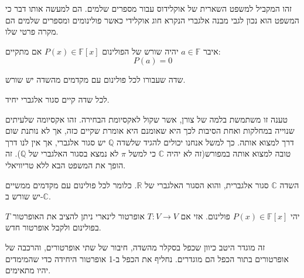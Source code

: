 \documentclass{tstextbook}
\begin{document}
\begin{remark}
זהו המקביל למשפט השארית של אוקלידוס עבור מספרים שלמים. הם למעשה אותו דבר כי המשפט הוא נכון לגבי מבנה אלגברי הנקרא חוג אוקלידי כאשר פולינומים ומספרים שלמים הם מקרה פרטי שלו.

\end{remark}
\begin{definition}
איבר \(a \in \mathbb{F}\) יהיה שורש של הפולינום \(P(x) \in \mathbb{F} [x]\) אם מתקיים:
$$P(a)=0$$

\end{definition}
\begin{definition}
שדה שעבורו לכל פולינום עם מקדמים מהשדה יש שורש.

\end{definition}
\begin{proposition}
לכל שדה קיים סגור אלגברי יחיד.

\end{proposition}
\begin{remark}
טענה זו משתמשת בלמה של צורן, אשר שקול לאקסיומת הבחירה. זהו אקסיומה שלעיתים שנוייה במחלקות ואחת הסיבות לכך היא שאומנם היא אומרת שקיים כזה, אך לא נותנת שום דרך למצוא אותה. כך למשל אנחנו יכולים להגיד שלשדה \(\mathbb{Q}\) יש סגור אלגברי, אך אין לנו דרך טובה למצוא אותה במפורש(זה לא יהיה \(\mathbb{C}\) כי למשל \(\pi\) לא נמצא בסגור האלגברי של \(\mathbb{Q}\)). זה הופך את המשפט הבא ללא טריוויאלי.

\end{remark}
\begin{theorem}
השדה \(\mathbb{C}\) סגור אלגברית, והוא הסגור האלגברי של \(\mathbb{R}\). כלומר לכל פולינום עם מקדמים ממשיים יש שורש ב-\(\mathbb{C}\).

\end{theorem}
\begin{definition}
יהי \(P(x)\in \mathbb{F} [x]\) פולינום. אזי אם \(T:V\to V\) אופרטור לינארי ניתן להציב את האופרטור \(T\) בפולינום ולקבל אופרטור חדש.

\end{definition}
\begin{remark}
זה מוגדר היטב כיוון שכפל בסקלר מהשדה, חיבור של שתי אופרטורים, והרכבה של אופרטורים בתור הכפל הם מוגדרים. נחליף את הכפל ב-1 אופרטור היחידה כדי שהמימדים יהיו מתאימים.

\end{remark}
\end{document}

